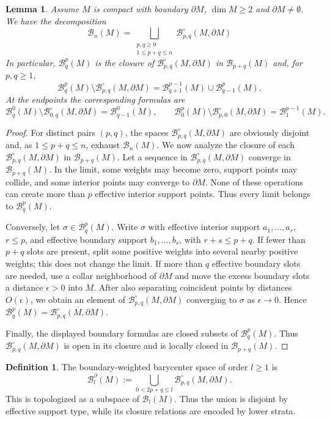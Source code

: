 \documentclass[11pt,a4paper]{article}
\numberwithin{equation}{section}
\newtheorem{lem}[thm]{Lemma}
\theoremstyle{definition}
\newtheorem{defn}[thm]{Definition}
\theoremstyle{remark}
\newcommand{\pa}{\partial}
\newcommand{\BB}{\mathcal B}
\begin{document}
\begin{lem}
Assume $M$ is compact with boundary $\pa M$, $\dim M\geq 2$ and $\pa M\neq\emptyset$. We have the decomposition
    $$\displaystyle \BB_n(M) = \bigsqcup_{\substack{p,q\ge0\\1\le p+q\leq n}} 
\BB_{p,q}^{\circ}(M,\pa M)$$
In particular, $\BB_q^p(M)$ is the closure of 
$\BB_{p,q}^{\circ}(M,\pa M)$ in
$\BB_{p+q}(M)$ and, for \(p,q\ge1\),
$$\BB_q^p(M)\setminus \BB_{p,q}^{\circ}(M,\pa M) = \BB_{q+1}^{p-1}(M)\cup \BB^p_{q-1}(M).$$
At the endpoints the corresponding formulas are
\[
\BB_q^0(M)\setminus \BB_{0,q}^{\circ}(M,\pa M)=\BB_{q-1}^0(M),
\qquad
\BB_0^p(M)\setminus \BB_{p,0}^{\circ}(M,\pa M)=\BB_1^{p-1}(M).
\]
\end{lem}

\begin{proof}
For distinct pairs $(p,q)$, the spaces $
\BB_{p,q}^{\circ}(M,\pa M)$ are obviously disjoint and, as
\(1\le p+q\le n\), exhaust $\BB_n(M)$.  We now analyze the closure of
each $\BB_{p,q}^{\circ}(M,\pa M)$ in $\BB_{p+q}(M)$.
Let a sequence in \(\BB_{p,q}^{\circ}(M,\pa M)\) converge in \(\BB_{p+q}(M)\).  In the limit, some weights may become zero, support points may collide, and some interior points may converge to \(\pa M\).  None of these operations can create more than \(p\) effective interior support points.  Thus every limit belongs to \(\BB_q^p(M)\).

Conversely, let \(\sigma\in\BB_q^p(M)\).  Write \(\sigma\) with effective interior support \(a_1,\ldots,a_r\), \(r\le p\), and effective boundary support \(b_1,\ldots,b_s\), with \(r+s\le p+q\).  If fewer than \(p+q\) slots are present, split some positive weights into several nearby positive weights; this does not change the limit.  If more than \(q\) effective boundary slots are needed, use a collar neighborhood of \(\pa M\) and move the excess boundary slots a distance \(\epsilon>0\) into \(\mathring M\).  After also separating coincident points by distances \(O(\epsilon)\), we obtain an element of \(\BB_{p,q}^{\circ}(M,\pa M)\) converging to \(\sigma\) as \(\epsilon\to0\).  Hence \(\BB_q^p(M)=\overline{\BB_{p,q}^{\circ}(M,\pa M)}\).

Finally, the displayed boundary formulas are closed subsets of $\BB_q^p(M)$. Thus $\BB_{p,q}^{\circ}(M,\pa M)$ is open in its closure and is locally closed in $\BB_{p+q}(M)$.
\end{proof}

\begin{defn}\rm The boundary-weighted barycenter space of order \(l\ge1\) is
\begin{equation*}
\BB_l^{\pa}(M):=
\bigcup_{0<2p+q\le l}\BB_{p,q}^{\circ}(M,\pa M).
\end{equation*}
This is topologized as a subspace of $\BB_l(M)$.  Thus the union is disjoint by effective support type, while its closure relations are encoded by lower strata.
\end{defn}
\end{document}
